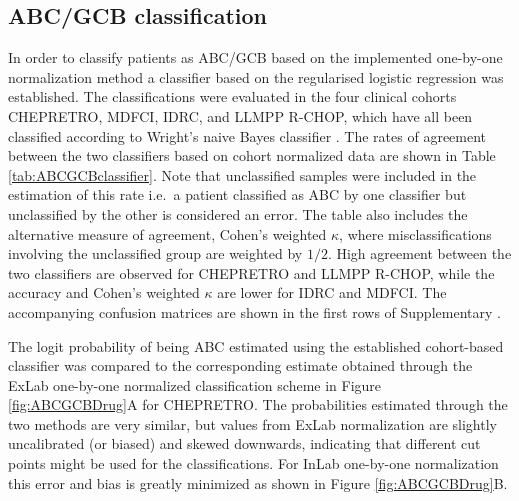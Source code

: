 \documentclass[10pt,letterpaper]{article}
\begin{document}
\subsection*{ABC/GCB classification}
In order to classify patients as ABC/GCB based on the implemented one-by-one normalization method a classifier based on the regularised logistic regression was established.
The classifications were evaluated in the four clinical cohorts CHEPRETRO, MDFCI, IDRC, and LLMPP R-CHOP, which have all been classified according to Wright's naive Bayes classifier \cite{DybkaerBoegsted2015,Wright2003,Lenz2008a}.
The rates of agreement between the two classifiers based on cohort normalized data are shown in Table \ref{tab:ABCGCBclassifier}. Note that unclassified samples were included in the estimation of this rate i.e.\ a patient classified as ABC by one classifier but unclassified by the other is considered an error.
The table also includes the alternative measure of agreement, Cohen's weighted $\kappa$, where misclassifications involving the unclassified group are weighted by $1/2$. High agreement between the two classifiers are observed for CHEPRETRO and LLMPP R-CHOP, while the accuracy and Cohen's weighted $\kappa$ are lower for IDRC and MDFCI.
The accompanying confusion matrices are shown in the first rows of Supplementary .

The logit probability of being ABC estimated using the established cohort-based classifier was compared to the corresponding estimate obtained through the ExLab one-by-one normalized classification scheme in Figure \ref{fig:ABCGCBDrug}A for CHEPRETRO.
The probabilities estimated through the two methods are very similar, but
values from ExLab normalization are slightly uncalibrated (or biased) and skewed downwards, indicating that different cut points might be used for the classifications.
For InLab one-by-one normalization this error and bias is greatly minimized as shown in Figure \ref{fig:ABCGCBDrug}B.
\end{document}
